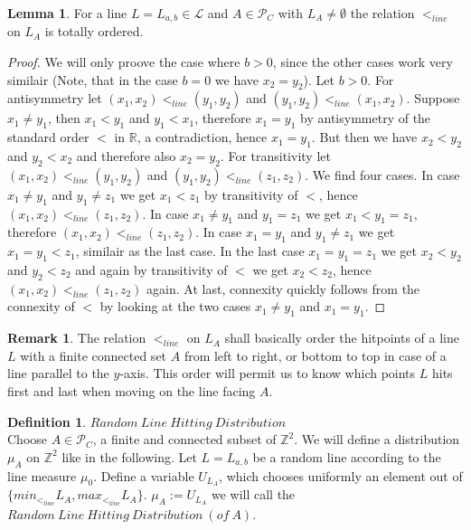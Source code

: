 \documentclass[12pt,a4paper]{scrartcl}
\numberwithin{equation}{section}
\numberwithin{equation}{section}%
\theoremstyle{definition}
\newtheorem{lemma}[theorem]{Lemma}
\newtheorem{definition}[theorem]{Definition}
\theoremstyle{definition}
\newtheorem{rem}[thm]{Remark}%
\begin{document}
\begin{lemma}
For a line $L=L_{a,b}\in \mathcal{L}$ and $A\in \mathcal{P}_C$ with $L_A\neq \emptyset$ the relation $<_{line}$ on $L_A$ is totally ordered. 
	\begin{proof}
		We will only proove the case where $b>0$, since the other cases work very similair (Note, that in the case $b=0$ we have $x_2 = y_2$). Let $b>0$. For antisymmetry let $(x_1, x_2) <_{line} (y_1, y_2)$ and $(y_1, y_2) <_{line} (x_1, x_2)$. Suppose $x_1\neq y_1$, then $x_1 < y_1$ and $y_1 < x_1$, therefore $x_1 = y_1$ by antisymmetry of the standard order $<$ in $\mathbb{R}$, a contradiction, hence $x_1 = y_1$. But then we have $x_2 < y_2$ and $y_2 < x_2$ and therefore also $x_2 = y_2$. For transitivity let $(x_1,x_2) <_{line} (y_1,y_2)$ and $(y_1,y_2) <_{line} (z_1,z_2)$. We find four cases. In case $x_1 \neq y_1$ and $y_1 \neq z_1$ we get $x_1 < z_1$ by transitivity of $<$, hence $(x_1,x_2) <_{line} (z_1,z_2)$. In case $x_1\neq y_1$ and $y_1 = z_1$ we get $x_1 < y_1 = z_1$, therefore $(x_1,x_2) <_{line} (z_1,z_2)$. In case $x_1 = y_1$ and $y_1 \neq z_1$ we get $x_1 = y_1 < z_1$, similair as the last case. In the last case $x_1 = y_1 = z_1$ we get $x_2 < y_2$ and $y_2 < z_2$ and again by transitivity of $<$ we get $x_2 < z_2$, hence $(x_1,x_2) <_{line} (z_1,z_2)$ again. At last, connexity quickly follows from the connexity of $<$ by looking at the two cases $x_1 \neq y_1$ and $x_1 = y_1$. 
	\end{proof}
\end{lemma}

\begin{rem}
	The relation $<_{line}$ on $L_A$ shall basically order the hitpoints of a line $L$ with a finite connected set $A$ from left to right, or bottom to top in case of a line parallel to the $y$-axis. This order will permit us to know which points $L$ hits first and last when moving on the line facing $A$.  
\end{rem}


\begin{definition} $\mathit{Random\ Line\ Hitting\ Distribution}$\\
	Choose $A\in \mathcal{P}_C$, a finite and connected subset of $\mathbb{Z}^2$. We will define a distribution $\mu_A$ on $\mathbb{Z}^2$ like in the following. 
	Let $L=L_{a,b}$ be a random line according to the line measure $\mu_0$. Define a variable $U_{L_A}$, which chooses uniformly an element out of $\{min_{<_{line}}L_A, max_{<_{line}}L_A\}$. $\mu_A := U_{L_A}$ we will call the $\mathit{Random\ Line\ Hitting\ Distribution\ (of\ A)}$.
\end{definition}
\end{document}
